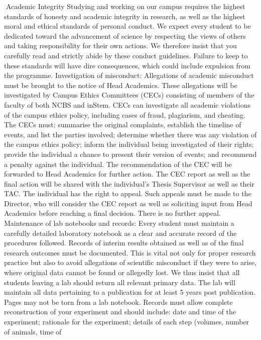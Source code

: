 \documentclass[a4paper,10pt]{article}
\begin{document}
Academic Integrity
Studying and working on our campus requires the highest standards of honesty and
academic integrity in research, as well as the highest moral and ethical standards of personal
conduct. We expect every student to be dedicated toward the advancement of science by
respecting the views of others and taking responsibility for their own actions. We therefore
insist that you carefully read and strictly abide by these conduct guidelines. Failure to keep
to these standards will have dire consequences, which could include expulsion from the
programme.
Investigation of misconduct: Allegations of academic misconduct must be brought to the
notice of Head Academics. These allegations will be investigated by Campus Ethics
Committees (CECs) consisting of members of the faculty of both NCBS and inStem. CECs
can investigate all academic violations of the campus ethics policy, including cases of fraud,
plagiarism, and cheating. The CECs must: summarise the original complaints, establish the
timeline of events, and list the parties involved; determine whether there was any violation
of the campus ethics policy; inform the individual being investigated of their rights; provide
the individual a chance to present their version of events; and recommend a penalty against
the individual. The recommendation of the CEC will be forwarded to Head Academics for
further action. The CEC report as well as the final action will be shared with the individual’s
Thesis Supervisor as well as their TAC. The individual has the right to appeal. Such appeals
must be made to the Director, who will consider the CEC report as well as soliciting input
from Head Academics before reaching a final decision. There is no further appeal.
Maintenance of lab notebooks and records: Every student must maintain a carefully
detailed laboratory notebook as a clear and accurate record of the procedures followed.
Records of interim results obtained as well as of the final research outcomes must be
documented. This is vital not only for proper research practice but also to avoid allegations
of scientific misconduct if they were to arise, where original data cannot be found or
allegedly lost. We thus insist that all students leaving a lab should return all relevant primary
data. The lab will maintain all data pertaining to a publication for at least 5 years post
publication. Pages may not be torn from a lab notebook. Records must allow complete
reconstruction of your experiment and should include: date and time of the experiment;
rationale for the experiment; details of each step (volumes, number of animals, time of
\end{document}
